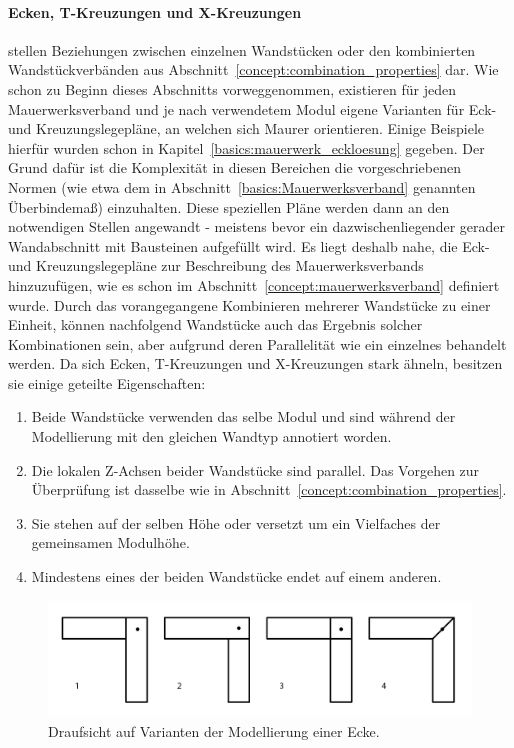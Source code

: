 \paragraph*{Ecken, T-Kreuzungen und X-Kreuzungen}\label{concept:corner_etc_properties} stellen Beziehungen zwischen einzelnen Wandstücken oder den kombinierten Wandstückverbänden aus Abschnitt~\ref{concept:combination_properties} dar.
Wie schon zu Beginn dieses Abschnitts vorweggenommen, existieren für jeden Mauerwerksverband und je nach verwendetem Modul eigene Varianten für Eck- und Kreuzungslegepläne, an welchen sich Maurer orientieren.
Einige Beispiele hierfür wurden schon in Kapitel~\ref{basics:mauerwerk_eckloesung} gegeben.
Der Grund dafür ist die Komplexität in diesen Bereichen die vorgeschriebenen Normen (wie etwa dem in Abschnitt~\ref{basics:Mauerwerksverband} genannten Überbindemaß) einzuhalten.
Diese speziellen Pläne werden dann an den notwendigen Stellen angewandt - meistens bevor ein dazwischenliegender gerader Wandabschnitt mit Bausteinen aufgefüllt wird.
Es liegt deshalb nahe, die Eck- und Kreuzungslegepläne zur Beschreibung des Mauerwerksverbands hinzuzufügen, wie es schon im Abschnitt~\ref{concept:mauerwerksverband} definiert wurde.
Durch das vorangegangene Kombinieren mehrerer Wandstücke zu einer Einheit, können nachfolgend Wandstücke auch das Ergebnis solcher Kombinationen sein, aber aufgrund deren Parallelität wie ein einzelnes behandelt werden.
Da sich Ecken, T-Kreuzungen und X-Kreuzungen stark ähneln, besitzen sie einige geteilte Eigenschaften:
\begin{enumerate}
    \item\label{concept:tmp1} Beide Wandstücke verwenden das selbe Modul und sind während der Modellierung mit den gleichen Wandtyp annotiert worden.
    \item Die lokalen Z-Achsen beider Wandstücke sind parallel. Das Vorgehen zur Überprüfung ist dasselbe wie in Abschnitt~\ref{concept:combination_properties}.
    \item Sie stehen auf der selben Höhe oder versetzt um ein Vielfaches der gemeinsamen Modulhöhe.
    \item\label{concept:tmp4} Mindestens eines der beiden Wandstücke endet auf einem anderen.
\end{enumerate}

\begin{figure}[ht]
    \centering
    \includegraphics[width=0.8\columnwidth]{fig/ecken_variationen.png}
    \caption{Draufsicht auf Varianten der Modellierung einer Ecke.}
    \label{fig:concept:ecken_variationen}
\end{figure}

